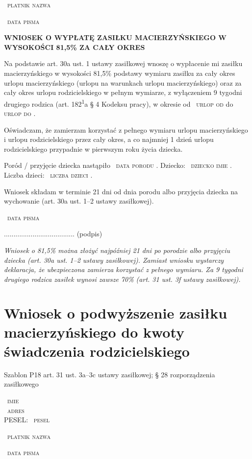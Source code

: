 \documentclass[11pt,a4paper]{article}
\newcommand{\Pole}[1]{%
  \textcolor{szary}{\dotfill}\,%
  {\scriptsize\textcolor{szary}{\textsc{#1}}}%
}
\newcommand{\NaglowekPisma}[1]{%
  \par\vspace{0.8em}%
  \begin{center}%
    {\large\bfseries\MakeUppercase{#1}}%
  \end{center}%
  \vspace{0.4em}%
}
\begin{document}
\Pole{platnik nazwa}

\Pole{data pisma}

\NaglowekPisma{WNIOSEK O WYPŁATĘ ZASIŁKU MACIERZYŃSKIEGO W WYSOKOŚCI 81,5\% ZA CAŁY OKRES}

Na podstawie art. 30a ust. 1 ustawy zasiłkowej wnoszę o wypłacenie mi
zasiłku macierzyńskiego w wysokości 81,5\% podstawy wymiaru zasiłku
za cały okres urlopu macierzyńskiego (urlopu na warunkach urlopu
macierzyńskiego) oraz za cały okres urlopu rodzicielskiego
w pełnym wymiarze, z wyłączeniem 9 tygodni drugiego rodzica
(art. 182\textsuperscript{1}a \S{} 4 Kodeksu pracy), w okresie od \Pole{urlop od} do \Pole{urlop do}.

Oświadczam, że zamierzam korzystać z pełnego wymiaru urlopu
macierzyńskiego i urlopu rodzicielskiego przez cały okres, a co najmniej
1 dzień urlopu rodzicielskiego przypadnie w pierwszym roku życia dziecka.

Poród / przyjęcie dziecka nastąpiło \Pole{data porodu}.
Dziecko: \Pole{dziecko imie}. Liczba dzieci: \Pole{liczba dzieci}.

Wniosek składam w terminie 21 dni od dnia porodu albo przyjęcia
dziecka na wychowanie (art. 30a ust. 1--2 ustawy zasiłkowej).

\Pole{data pisma}
.....................................
(podpis)

\vfill
{\footnotesize\color{szary}\itshape Wniosek o 81,5\% można złożyć najpóźniej 21 dni po porodzie albo przyjęciu dziecka (art. 30a ust. 1--2 ustawy zasiłkowej). Zamiast wniosku wystarczy deklaracja, że ubezpieczona zamierza korzystać z pełnego wymiaru. Za 9 tygodni drugiego rodzica zasiłek wynosi zawsze 70\% (art. 31 ust. 3f ustawy zasiłkowej). }

\clearpage

\section{Wniosek o podwyższenie zasiłku macierzyńskiego do kwoty świadczenia rodzicielskiego}

{\small\color{szary}Szablon P18 \textbullet{} art. 31 ust. 3a--3c ustawy zasiłkowej; \S{} 28 rozporządzenia zasiłkowego}

\Pole{imie}\\[-2pt]
\Pole{adres}\\[-2pt]
PESEL: \Pole{pesel}

\Pole{platnik nazwa}

\Pole{data pisma}
\end{document}

